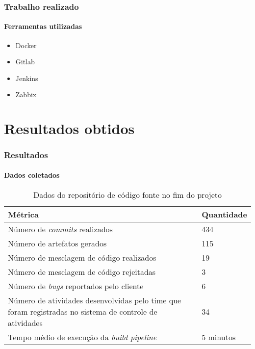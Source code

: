 \documentclass[aspectratio=169]{beamer}
\begin{document}
\begin{frame}
	\frametitle{Trabalho realizado}
	\framesubtitle{Ferramentas utilizadas}
	
	\begin{itemize}
		
		\item Docker 
		
		\item Gitlab
		
		\item Jenkins
		
		\item Zabbix
		
	\end{itemize}
	
\end{frame}

\section{Resultados obtidos}

\begin{frame}
	\frametitle{Resultados}
	\framesubtitle{Dados coletados}
	
	\begin{table}[htb]
		\caption{Dados do repositório de código fonte no fim do projeto}
		
		\label{tab-code-analysis-new}	
		\begin{tabular}{p{7.15cm}|p{5.10cm}}
			\textbf{Métrica} & \textbf{Quantidade}  \\
			\hline
			Número de \textit{commits} realizados & 434 \\
			\hline
			Número de artefatos gerados & 115 \\
			\hline
			Número de mesclagem de código realizados & 19 \\
			\hline
			Número de mesclagem de código rejeitadas & 3 \\
			\hline
			Número de \textit{bugs} reportados pelo cliente & 6 \\
			\hline
			Número de atividades desenvolvidas pelo time que foram registradas no sistema de controle de atividades & 34 \\
			\hline
			Tempo médio de execução da \textit{build pipeline} & 5 minutos \\
		\end{tabular}
	\end{table}
	
\end{frame}
\end{document}
